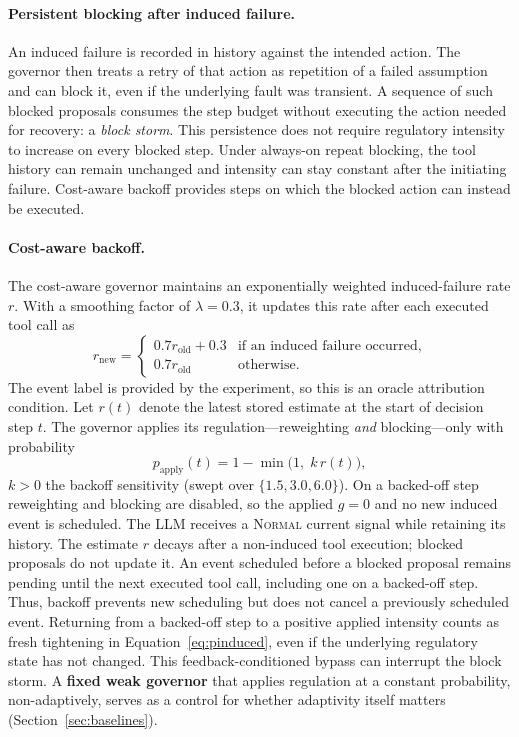 \documentclass[11pt]{article}
\begin{document}
\paragraph{Persistent blocking after induced failure.}
An induced failure is recorded in history against the intended action. The
governor then treats a retry of that action as repetition of a failed
assumption and can block it, even if the underlying fault was transient. A
sequence of such blocked proposals consumes the step budget without executing
the action needed for recovery: a \emph{block storm}. This persistence does
not require regulatory intensity to increase on every blocked step. Under
always-on repeat blocking, the tool history can remain unchanged and intensity
can stay constant after the initiating failure. Cost-aware backoff provides
steps on which the blocked action can instead be executed.

\paragraph{Cost-aware backoff.}
The cost-aware governor maintains an exponentially weighted induced-failure
rate $r$. With a smoothing factor of $\lambda=0.3$, it updates this rate after
each executed tool call as
\[
r_{\text{new}}=
\begin{cases}
0.7r_{\text{old}}+0.3 & \text{if an induced failure occurred},\\
0.7r_{\text{old}} & \text{otherwise}.
\end{cases}
\]
The event label is provided by the experiment, so this is an oracle attribution
condition. Let
$r(t)$ denote the latest stored estimate at the start of decision step $t$.
The governor applies its regulation---reweighting \emph{and}
blocking---only with probability
\begin{equation}
p_{\mathrm{apply}}(t)=1-\min\!\big(1,\;k\,r(t)\big),
\label{eq:papply}
\end{equation}
$k>0$ the backoff sensitivity (swept over $\{1.5,3.0,6.0\}$). On a backed-off
step reweighting and blocking are disabled, so the applied $g=0$ and no new
induced event is scheduled. The LLM receives a \textsc{Normal} current signal
while retaining its history. The estimate $r$ decays after a non-induced tool
execution; blocked proposals do not update it. An event scheduled before a
blocked proposal remains pending until the next executed tool call, including
one on a backed-off step. Thus, backoff prevents new scheduling but does not
cancel a previously scheduled event. Returning from a backed-off step to a
positive applied intensity counts as fresh tightening in
Equation~\ref{eq:pinduced}, even if the underlying regulatory state has not
changed. This feedback-conditioned bypass can interrupt the block storm.
A \textbf{fixed weak governor} that applies regulation
at a constant probability, non-adaptively, serves as a control for whether
adaptivity itself matters (Section~\ref{sec:baselines}).
\end{document}
